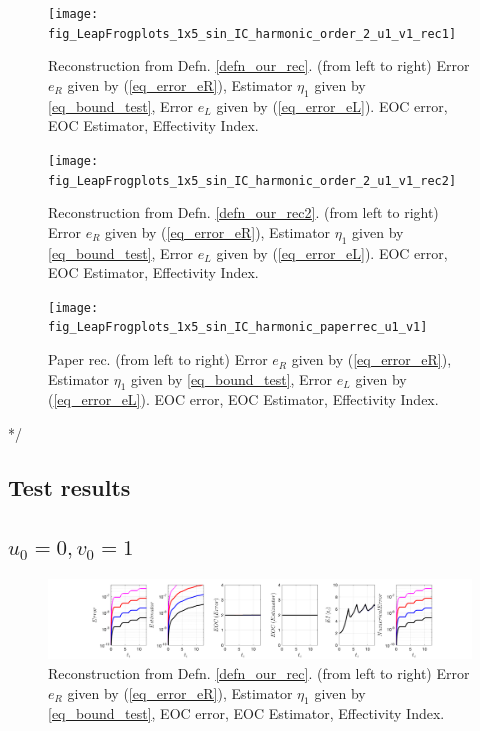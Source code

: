 \documentclass[12pt,a4paper]{article}
\numberwithin{equation}{section}
\theoremstyle{definition}
\begin{document}
\begin{figure}[H]
	\hspace{-3cm}
	\texttt{[image: fig\_LeapFrogplots\_1x5\_sin\_IC\_harmonic\_order\_2\_u1\_v1\_rec1]}	
	\caption{Reconstruction from Defn. \ref{defn_our_rec}. (from left to right) Error $e_R$ given by (\ref{eq_error_eR}), Estimator $\eta_1$ given by \ref{eq_bound_test}, Error $e_L$ given by  (\ref{eq_error_eL}). EOC error, EOC Estimator, Effectivity Index.}
	\label{fig_all_in_one_our_rec_1_u1_v1}
\end{figure}

\begin{figure}[H]
	\hspace{-3cm}
	\texttt{[image: fig\_LeapFrogplots\_1x5\_sin\_IC\_harmonic\_order\_2\_u1\_v1\_rec2]}	
	\caption{Reconstruction from Defn. \ref{defn_our_rec2}. (from left to right) Error $e_R$ given by (\ref{eq_error_eR}), Estimator $\eta_1$ given by \ref{eq_bound_test}, Error $e_L$ given by  (\ref{eq_error_eL}). EOC error, EOC Estimator, Effectivity Index.}
	\label{fig_all_in_one_our_rec_2_u1_v1}
\end{figure}

\begin{figure}[H]
	\hspace{-3cm}
	\texttt{[image: fig\_LeapFrogplots\_1x5\_sin\_IC\_harmonic\_paperrec\_u1\_v1]}	
	\caption{Paper rec.   (from left to right) Error $e_R$ given by (\ref{eq_error_eR}), Estimator $\eta_1$ given by \ref{eq_bound_test}, Error $e_L$ given by  (\ref{eq_error_eL}). EOC error, EOC Estimator, Effectivity Index. }
	\label{fig_all_in_one_paper_rec_2_u1_v1}
\end{figure}


*/
\subsection{Test results}\label{sec:num_exp}
\subsection*{$u_0=0, v_0= 1$}
\begin{figure}[H]
	\hspace{-3cm}
	\includegraphics[scale=0.55]{fig_LeapFrogplots_1x5_sin_IC_harmonic_order_2_u0_v10_rec_george}	
	\caption{Reconstruction from Defn. \ref{defn_our_rec}. (from left to right) Error $e_R$ given by (\ref{eq_error_eR}), Estimator $\eta_1$ given by \ref{eq_bound_test}, EOC error, EOC Estimator, Effectivity Index.}
	\label{fig_all_in_one_our_rec_george_u0_v10}
\end{figure}
\end{document}
